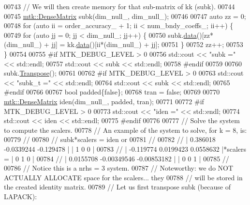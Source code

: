\begin{DoxyCode}
{{00743   \textcolor{comment}{// We will then create memory for that sub-matrix of kk (subk).}
00744 
00745   \hyperlink{classmtk_1_1DenseMatrix}{mtk::DenseMatrix} subk(dim\_null\_, dim\_null\_);
00746 
00747   \textcolor{keyword}{auto} zz = 0;
00748   \textcolor{keywordflow}{for} (\textcolor{keyword}{auto} ii = order\_accuracy\_ + 1; ii < num\_bndy\_coeffs\_; ii++) \{
00749     \textcolor{keywordflow}{for} (\textcolor{keyword}{auto} jj = 0; jj < dim\_null\_; jj++) \{
00750       subk.\hyperlink{classmtk_1_1DenseMatrix_a0c33b8a9e01d157c61ddbdf807c25d84}{data}()[zz*(dim\_null\_) + jj] = kk.\hyperlink{classmtk_1_1DenseMatrix_a0c33b8a9e01d157c61ddbdf807c25d84}{data}()[ii*(dim\_null\_) + jj];
00751     \}
00752     zz++;
00753   \}
00754 
00755 \textcolor{preprocessor}{  #if MTK\_DEBUG\_LEVEL > 0}
00756   std::cout << \textcolor{stringliteral}{"subk ="} << std::endl;
00757   std::cout << subk << std::endl;
00758 \textcolor{preprocessor}{  #endif}
00759 
00760   subk.\hyperlink{classmtk_1_1DenseMatrix_a71d9c07ca66e88d97d1fd5012f43138b}{Transpose}();
00761 
00762 \textcolor{preprocessor}{  #if MTK\_DEBUG\_LEVEL > 0}
00763   std::cout << \textcolor{stringliteral}{"subk\_t ="} << std::endl;
00764   std::cout << subk << std::endl;
00765 \textcolor{preprocessor}{  #endif}
00766 
00767   \textcolor{keywordtype}{bool} padded\{\textcolor{keyword}{false}\};
00768   tran = \textcolor{keyword}{false};
00769 
00770   \hyperlink{classmtk_1_1DenseMatrix}{mtk::DenseMatrix} iden(dim\_null\_, padded, tran);
00771 
00772 \textcolor{preprocessor}{  #if MTK\_DEBUG\_LEVEL > 0}
00773   std::cout << \textcolor{stringliteral}{"iden ="} << std::endl;
00774   std::cout << iden << std::endl;
00775 \textcolor{preprocessor}{  #endif}
00776 
00777   \textcolor{comment}{// Solve the system to compute the scalers.}
00778   \textcolor{comment}{// An example of the system to solve, for k = 8, is:}
00779   \textcolor{comment}{//}
00780   \textcolor{comment}{// subk*scalers = iden or}
00781   \textcolor{comment}{//}
00782   \textcolor{comment}{// |  0.386018  -0.0339244   -0.129478 |           | 1 0 0 |}
00783   \textcolor{comment}{// | -0.119774   0.0199423   0.0558632 |*scalers = | 0 1 0 |}
00784   \textcolor{comment}{// | 0.0155708 -0.00349546 -0.00853182 |           | 0 0 1 |}
00785   \textcolor{comment}{//}
00786   \textcolor{comment}{// Notice this is a nrhs = 3 system.}
00787   \textcolor{comment}{// Noteworthy: we do NOT ACTUALLY ALLOCATE space for the scalers... they}
00788   \textcolor{comment}{// will be stored in the created identity matrix.}
00789   \textcolor{comment}{// Let us first transpose subk (because of LAPACK):}
}}
\end{DoxyCode}

